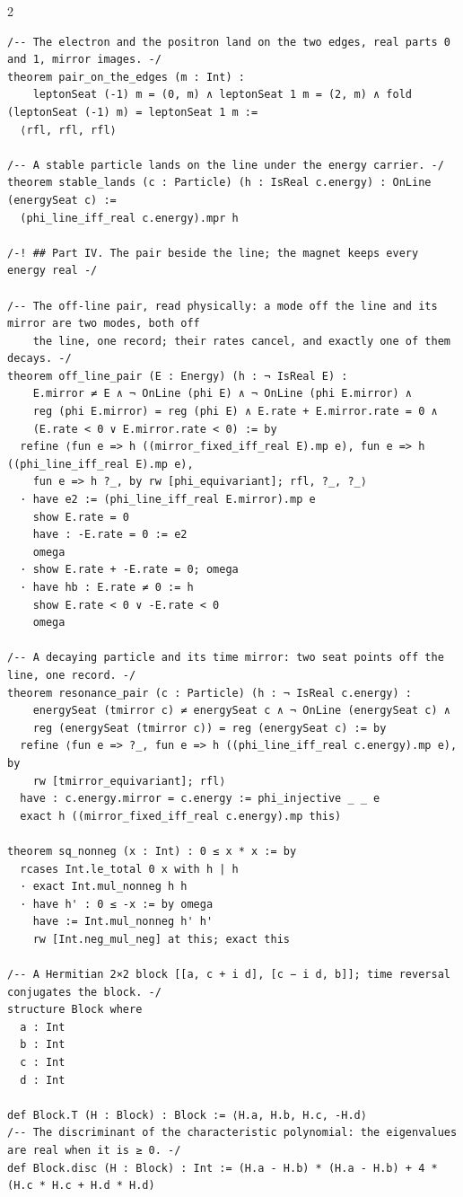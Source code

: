 \documentclass[10pt]{article}
\begin{document}
\begin{multicols}{2}
\begin{Verbatim}[fontsize=\fontsize{6.2}{7.2}\selectfont,breaklines,breakanywhere,breaksymbolleft={}]
/-- The electron and the positron land on the two edges, real parts 0 and 1, mirror images. -/
theorem pair_on_the_edges (m : Int) :
    leptonSeat (-1) m = (0, m) ∧ leptonSeat 1 m = (2, m) ∧ fold (leptonSeat (-1) m) = leptonSeat 1 m :=
  ⟨rfl, rfl, rfl⟩

/-- A stable particle lands on the line under the energy carrier. -/
theorem stable_lands (c : Particle) (h : IsReal c.energy) : OnLine (energySeat c) :=
  (phi_line_iff_real c.energy).mpr h

/-! ## Part IV. The pair beside the line; the magnet keeps every energy real -/

/-- The off-line pair, read physically: a mode off the line and its mirror are two modes, both off
    the line, one record; their rates cancel, and exactly one of them decays. -/
theorem off_line_pair (E : Energy) (h : ¬ IsReal E) :
    E.mirror ≠ E ∧ ¬ OnLine (phi E) ∧ ¬ OnLine (phi E.mirror) ∧
    reg (phi E.mirror) = reg (phi E) ∧ E.rate + E.mirror.rate = 0 ∧
    (E.rate < 0 ∨ E.mirror.rate < 0) := by
  refine ⟨fun e => h ((mirror_fixed_iff_real E).mp e), fun e => h ((phi_line_iff_real E).mp e),
    fun e => h ?_, by rw [phi_equivariant]; rfl, ?_, ?_⟩
  · have e2 := (phi_line_iff_real E.mirror).mp e
    show E.rate = 0
    have : -E.rate = 0 := e2
    omega
  · show E.rate + -E.rate = 0; omega
  · have hb : E.rate ≠ 0 := h
    show E.rate < 0 ∨ -E.rate < 0
    omega

/-- A decaying particle and its time mirror: two seat points off the line, one record. -/
theorem resonance_pair (c : Particle) (h : ¬ IsReal c.energy) :
    energySeat (tmirror c) ≠ energySeat c ∧ ¬ OnLine (energySeat c) ∧
    reg (energySeat (tmirror c)) = reg (energySeat c) := by
  refine ⟨fun e => ?_, fun e => h ((phi_line_iff_real c.energy).mp e), by
    rw [tmirror_equivariant]; rfl⟩
  have : c.energy.mirror = c.energy := phi_injective _ _ e
  exact h ((mirror_fixed_iff_real c.energy).mp this)

theorem sq_nonneg (x : Int) : 0 ≤ x * x := by
  rcases Int.le_total 0 x with h | h
  · exact Int.mul_nonneg h h
  · have h' : 0 ≤ -x := by omega
    have := Int.mul_nonneg h' h'
    rw [Int.neg_mul_neg] at this; exact this

/-- A Hermitian 2×2 block [[a, c + i d], [c − i d, b]]; time reversal conjugates the block. -/
structure Block where
  a : Int
  b : Int
  c : Int
  d : Int

def Block.T (H : Block) : Block := ⟨H.a, H.b, H.c, -H.d⟩
/-- The discriminant of the characteristic polynomial: the eigenvalues are real when it is ≥ 0. -/
def Block.disc (H : Block) : Int := (H.a - H.b) * (H.a - H.b) + 4 * (H.c * H.c + H.d * H.d)


\end{Verbatim}
\end{multicols}
\end{document}
